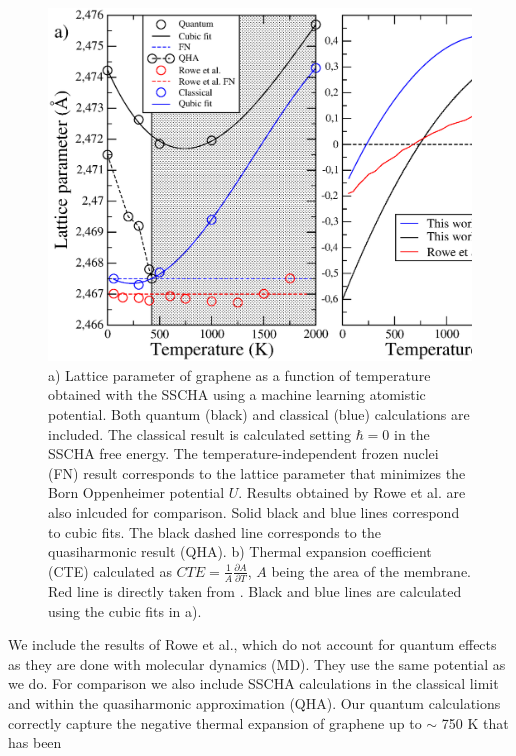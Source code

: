 \begin{figure}[ht]
\includegraphics[width=0.99\linewidth]{Figures/lattice.eps}
\caption[Lattice parameter of graphene as a function of temperature]{a) Lattice parameter of graphene as a function 
	of temperature obtained with the SSCHA using a machine learning atomistic potential. Both quantum (black) and 
	classical (blue) calculations are included. The classical result is calculated setting $\hbar=0$ in the SSCHA 
	free energy. The temperature-independent frozen nuclei (FN) result corresponds to the lattice parameter that 
	minimizes the Born Oppenheimer potential $U$. Results obtained by Rowe et al.\cite{rowe2018development} are 
	also inlcuded for comparison. Solid black and blue lines correspond to cubic fits. The black dashed line 
	corresponds to the quasiharmonic result (QHA). b) Thermal expansion coefficient (CTE) calculated as 
	$CTE=\frac{1}{A}\frac{\partial A}{\partial T}$, $A$ being the area of the membrane. Red line is directly 
	taken from \cite{rowe2018development}. Black and blue lines are calculated using the cubic fits in a).}
\label{lattice}
\end{figure}
We include the results of Rowe et al.\cite{rowe2018development}, which do not account for quantum effects as they 
are done with molecular dynamics (MD). They use the same potential as we do. For comparison we also include SSCHA 
calculations in the classical limit and within the quasiharmonic approximation\cite{bonini2007phonon} (QHA). Our 
quantum calculations correctly capture the negative thermal expansion of graphene up to $\sim$ 750 K that has been 
